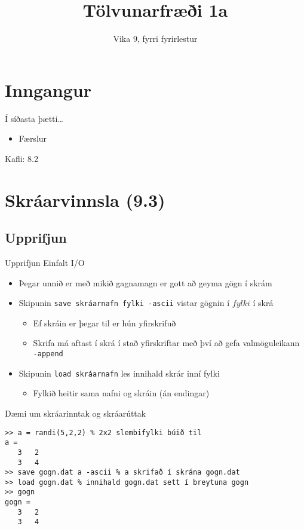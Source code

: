\documentclass{beamer}
\title{Tölvunarfræði 1a}
\subtitle{Vika 9, fyrri fyrirlestur}
\begin{document}
\begin{frame}
\titlepage
\end{frame}

\section{Inngangur}

\begin{frame}{Í síðasta þætti\ldots}
\begin{itemize}
 \item Færslur
\end{itemize}
Kafli: 8.2
\end{frame}

\section{Skráarvinnsla (9.3)}

\subsection{Upprifjun}

\begin{frame}{Upprifjun Einfalt I/O}
\begin{itemize}
 \item Þegar unnið er með mikið gagnamagn er gott að geyma gögn í skrám
 \item Skipunin \texttt{save skráarnafn fylki -ascii} vistar gögnin í $fylki$ í skrá
 \begin{itemize}
  \item Ef skráin er þegar til er hún yfirskrifuð
  \item Skrifa má aftast í skrá í stað yfirskriftar með því að gefa valmöguleikann \texttt{-append}
 \end{itemize}
 \item Skipunin \texttt{load skráarnafn} les innihald skrár inní fylki
  \begin{itemize}
   \item Fylkið heitir sama nafni og skráin (án endingar)
  \end{itemize}
 \end{itemize}
\end{frame}

\begin{frame}[fragile]{Dæmi um skráarinntak og skráarúttak}
\begin{verbatim}
>> a = randi(5,2,2) % 2x2 slembifylki búið til
a =
   3   2
   3   4
>> save gogn.dat a -ascii % a skrifað í skrána gogn.dat
>> load gogn.dat % innihald gogn.dat sett í breytuna gogn
>> gogn
gogn =
   3   2
   3   4
\end{verbatim}
\end{frame}
\end{document}
